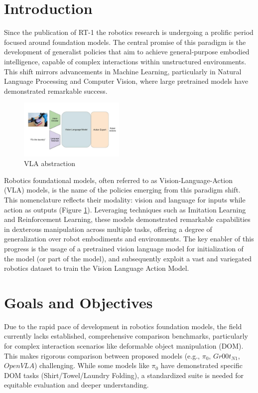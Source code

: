 \section{Introduction}

Since the publication of RT-1 \cite{RT-1} the robotics research is undergoing a prolific period focused around foundation models. The central promise of this paradigm is the development of generalist policies that aim to achieve general-purpose embodied intelligence, capable of complex interactions within unstructured environments. This shift mirrors advancements in Machine Learning, particularly in Natural Language Processing and Computer Vision, where large pretrained models have demonstrated remarkable success.

\begin{figure}
    \centering
    \includegraphics[width=0.45\textwidth]{images/vla.jpg}
    \caption{VLA abstraction}
    \label{fig:vla_abstraction}
\end{figure}

Robotics foundational models, often referred to as Vision-Language-Action (VLA) models, is the name of the policies emerging from this paradigm shift. This nomenclature reflects their modality: vision and language for inputs while action as outputs (Figure \ref{fig:vla_abstraction}). Leveraging techniques such as Imitation Learning and Reinforcement Learning, these models demonstrated remarkable capabilities in dexterous manipulation across multiple tasks, offering a degree of generalization over robot embodiments and environments. The key enabler of this progress is the usage of a pretrained vision language model for initialization of the model (or part of the model), and subsequently exploit a vast and variegated robotics dataset to train the Vision Language Action Model.

\section{Goals and Objectives}
Due to the rapid pace of development in robotics foundation models, the field currently lacks established, comprehensive comparison benchmarks, particularly for complex interaction scenarios like deformable object manipulation (DOM). This makes rigorous comparison between proposed models (e.g., $\pi_0$, $Gr00t_{N1}$, $OpenVLA$) challenging. While some models like $\pi_0$ have demonstrated specific DOM tasks (Shirt/Towel/Laundry Folding), a standardized suite is needed for equitable evaluation and deeper understanding.

